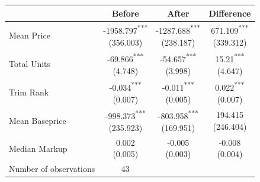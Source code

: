 \begin{tabular}{l|ccc}
\toprule
 & Before & After & Difference \\
\midrule
Mean Price & \makecell{-1958.797\textsuperscript{***} \\ (356.003)\\[0.25em]} & \makecell{-1287.688\textsuperscript{***} \\ (238.187)\\[0.25em]} & \makecell{671.109\textsuperscript{***} \\ (339.312)\\[0.25em]} \\
Total Units & \makecell{-69.866\textsuperscript{***} \\ (4.748)\\[0.25em]} & \makecell{-54.657\textsuperscript{***} \\ (3.998)\\[0.25em]} & \makecell{15.21\textsuperscript{***} \\ (4.647)\\[0.25em]} \\
Trim Rank & \makecell{-0.034\textsuperscript{***} \\ (0.007)\\[0.25em]} & \makecell{-0.011\textsuperscript{***} \\ (0.005)\\[0.25em]} & \makecell{0.022\textsuperscript{***} \\ (0.007)\\[0.25em]} \\
Mean Baseprice & \makecell{-998.373\textsuperscript{***} \\ (235.923)\\[0.25em]} & \makecell{-803.958\textsuperscript{***} \\ (169.951)\\[0.25em]} & \makecell{194.415 \\ (246.404)\\[0.25em]} \\
Median Markup & \makecell{0.002 \\ (0.005)\\[0.25em]} & \makecell{-0.005 \\ (0.003)\\[0.25em]} & \makecell{-0.008 \\ (0.004)\\[0.25em]} \\
\midrule
Number of observations & 43 &  \\
\bottomrule
\end{tabular}
